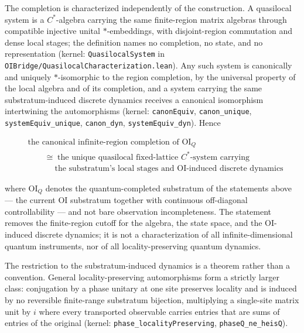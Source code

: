 \documentclass[
]{article}
\begin{document}
The completion is characterized independently of the construction. A
quasilocal system is a \(C^{*}\)-algebra carrying the same finite-region
matrix algebras through compatible injective unital \(*\)-embeddings,
with disjoint-region commutation and dense local stages; the definition
names no completion, no state, and no representation (kernel:
\texttt{QuasilocalSystem} in
\texttt{OIBridge/QuasilocalCharacterization.lean}). Any such system is
canonically and uniquely \(*\)-isomorphic to the region completion, by
the universal property of the local algebra and of its completion, and a
system carrying the same substratum-induced discrete dynamics receives a
canonical isomorphism intertwining the automorphisms (kernel:
\texttt{canonEquiv}, \texttt{canon\_unique},
\texttt{systemEquiv\_unique}, \texttt{canon\_dyn},
\texttt{systemEquiv\_dyn}). Hence

\[\boxed{\begin{aligned}&\text{the canonical infinite-region completion of } \mathrm{OI}_Q\\ &\qquad \cong\; \text{the unique quasilocal fixed-lattice } C^{*}\text{-system carrying}\\ &\qquad\quad\; \text{the substratum's local stages and OI-induced discrete dynamics}\end{aligned}}\]

where \(\mathrm{OI}_Q\) denotes the quantum-completed substratum of the
statements above --- the current OI substratum together with continuous
off-diagonal controllability --- and not bare observation
incompleteness. The statement removes the finite-region cutoff for the
algebra, the state space, and the OI-induced discrete dynamics; it is
not a characterization of all infinite-dimensional quantum instruments,
nor of all locality-preserving quantum dynamics.

The restriction to the substratum-induced dynamics is a theorem rather
than a convention. General locality-preserving automorphisms form a
strictly larger class: conjugation by a phase unitary at one site
preserves locality and is induced by no reversible finite-range
substratum bijection, multiplying a single-site matrix unit by \(i\)
where every transported observable carries entries that are sums of
entries of the original (kernel: \texttt{phase\_localityPreserving},
\texttt{phaseQ\_ne\_heisQ}).
\end{document}
